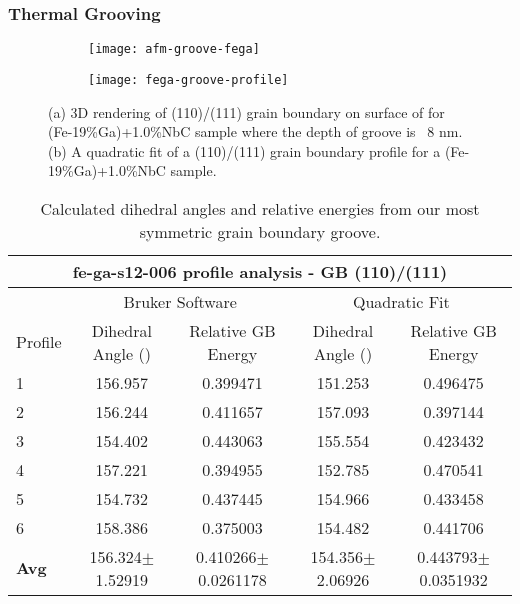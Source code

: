 
\subsubsection{Thermal Grooving}



\begin{figure}[h!]
	\centering
	\begin{subfigure}[c]{0.45\textwidth}
		\texttt{[image: afm-groove-fega]}
		\subcaption{~}
		\label{fig:afm-groove-fega}		
	\end{subfigure}
	\begin{subfigure}[c]{0.45\textwidth} 
		\texttt{[image: fega-groove-profile]}
		\subcaption{~}
		\label{fig:fega-groove-profile}		
	\end{subfigure}
	\caption{(a) 3D rendering of (110)/(111) grain boundary on surface of  for (Fe-19\%Ga)+1.0\%NbC sample where the depth of groove is ~8 nm. (b) A quadratic fit of a (110)/(111) grain boundary profile for a (Fe-19\%Ga)+1.0\%NbC sample.}
	\label{fig:thermal-groove}
\end{figure}

\begin{table}[h!]
	\centering
	\caption{Calculated dihedral angles and relative energies from our most symmetric grain boundary groove.}
	\begin{tabular} { |p{1cm}||c|c|c|c|  } 
		\hline
		\multicolumn{5}{|c|}{fe-ga-s12-006 profile analysis - GB (110)/(111)}\\
		\hline
		~	&\multicolumn{2}{|c|}{Bruker Software}		&\multicolumn{2}{|c|}{Quadratic Fit}	\\
		\hline
		Profile	&Dihedral Angle (\degree)	&Relative GB Energy	&Dihedral Angle (\degree)	&Relative GB Energy \\ 
		\hline
		1		&156.957	&0.399471	&151.253	&0.496475	\\
		\hline
		2		&156.244	&0.411657	&157.093	&0.397144	\\
		\hline
		3		&154.402	&0.443063	&155.554	&0.423432	\\
		\hline
		4		&157.221	&0.394955	&152.785	&0.470541	\\
		\hline
		5		&154.732	&0.437445	&154.966	&0.433458	\\
		\hline
		6		&158.386	&0.375003	&154.482	&0.441706	\\
		\hline
		\textbf{Avg}	&156.324$\pm$1.52919	&0.410266$\pm$0.0261178	&154.356$\pm$2.06926	&0.443793$\pm$0.0351932\\
		\hline
	\end{tabular}
	\label{groove-analysis}
\end{table}


